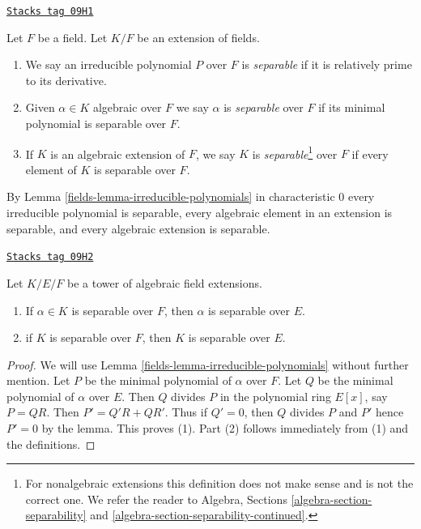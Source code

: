 \begin{definition}[Separable]
\label{fields-definition-separable}
\href{https://stacks.math.columbia.edu/tag/09H1}{\texttt{Stacks tag 09H1}}

Let $F$ be a field. Let $K/F$ be an extension of fields.
\begin{enumerate}
\item We say an irreducible polynomial $P$ over $F$ is {\it separable}
if it is relatively prime to its derivative.
\item Given $\alpha \in K$ algebraic over $F$ we say $\alpha$ is
{\it separable} over $F$ if its minimal polynomial is separable over $F$.
\item If $K$ is an algebraic extension of $F$, we say $K$ is
{\it separable}\footnote{For nonalgebraic extensions
this definition does not make sense and is not the correct one. We refer
the reader to Algebra, Sections \ref{algebra-section-separability} and
\ref{algebra-section-separability-continued}.}
over $F$ if every element of $K$ is separable over $F$.
\end{enumerate}
\end{definition}

By Lemma \ref{fields-lemma-irreducible-polynomials} in characteristic $0$ every
irreducible polynomial is separable, every algebraic element in an extension
is separable, and every algebraic extension is separable.

\begin{lemma}
\label{fields-lemma-separable-goes-up}
\href{https://stacks.math.columbia.edu/tag/09H2}{\texttt{Stacks tag 09H2}}

Let $K/E/F$ be a tower of algebraic field extensions.
\begin{enumerate}
\item If $\alpha \in K$ is separable over $F$, then $\alpha$ is separable
over $E$.
\item if $K$ is separable over $F$, then $K$ is separable over $E$.
\end{enumerate}
\end{lemma}

\begin{proof}

We will use Lemma \ref{fields-lemma-irreducible-polynomials} without further mention.
Let $P$ be the minimal polynomial of $\alpha$ over $F$.
Let $Q$ be the minimal polynomial of $\alpha$ over $E$.
Then $Q$ divides $P$ in the polynomial ring $E[x]$, say $P = QR$.
Then $P' = Q'R + QR'$. Thus if $Q' = 0$, then $Q$ divides $P$ and $P'$
hence $P' = 0$ by the lemma. This proves (1). Part (2)
follows immediately from (1) and the definitions.
\end{proof}

